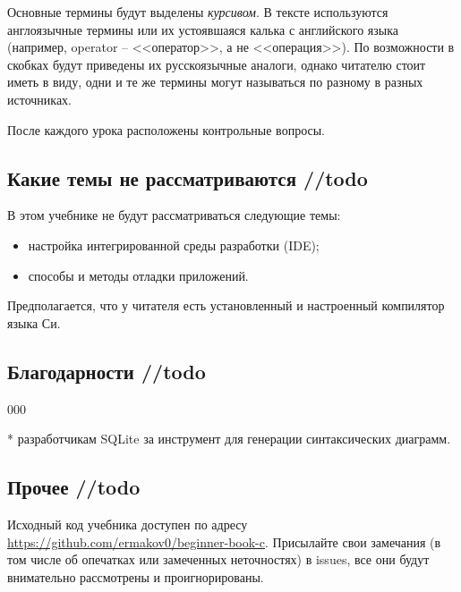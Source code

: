 \documentclass[myc.tex]{subfiles}
\begin{document}
Основные термины будут выделены \textit{курсивом}. В тексте используются англоязычные термины или их устоявшаяся калька с английского языка (например, operator -- <<оператор>>, а не <<операция>>). По возможности в скобках будут приведены их русскоязычные аналоги, однако читателю стоит иметь в виду, одни и те же термины могут называться по разному в разных источниках.

После каждого урока расположены контрольные вопросы.




\subsection*{Какие темы не рассматриваются //todo}
В этом учебнике не будут рассматриваться следующие темы:
\begin{itemize}
\item настройка интегрированной среды разработки (IDE);
\item способы и методы отладки приложений.
\end{itemize}

Предполагается, что у читателя есть установленный и настроенный компилятор языка Си.


\subsection*{Благодарности //todo}
000

* разработчикам SQLite за инструмент для генерации синтаксических диаграмм.







\subsection*{Прочее //todo}
Исходный код учебника доступен по адресу \url{https://github.com/ermakov0/beginner-book-c}. Присылайте свои замечания (в том числе об опечатках или замеченных неточностях) в issues, все они будут внимательно рассмотрены и проигнорированы.
\end{document}
